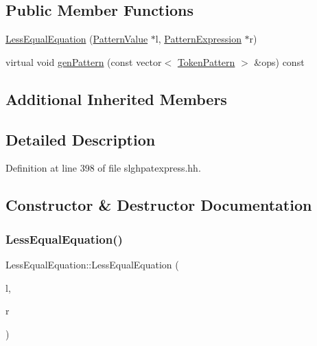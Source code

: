 \subsection*{Public Member Functions}
\begin{DoxyCompactItemize}
\item 
\mbox{\hyperlink{class_less_equal_equation_a382850b818427f262e9131aacb8fa949}{Less\+Equal\+Equation}} (\mbox{\hyperlink{class_pattern_value}{Pattern\+Value}} $\ast$l, \mbox{\hyperlink{class_pattern_expression}{Pattern\+Expression}} $\ast$r)
\item 
virtual void \mbox{\hyperlink{class_less_equal_equation_ace9862ee9b24e31d3e07b76556f3e220}{gen\+Pattern}} (const vector$<$ \mbox{\hyperlink{class_token_pattern}{Token\+Pattern}} $>$ \&ops) const
\end{DoxyCompactItemize}
\subsection*{Additional Inherited Members}


\subsection{Detailed Description}


Definition at line 398 of file slghpatexpress.\+hh.



\subsection{Constructor \& Destructor Documentation}
\mbox{\label{class_less_equal_equation_a382850b818427f262e9131aacb8fa949}} 
\subsubsection{\texorpdfstring{LessEqualEquation()}{LessEqualEquation()}}
{\footnotesize\ttfamily Less\+Equal\+Equation\+::\+Less\+Equal\+Equation (\begin{DoxyParamCaption}\item[{\mbox{\hyperlink{class_pattern_value}{Pattern\+Value}} $\ast$}]{l,  }\item[{\mbox{\hyperlink{class_pattern_expression}{Pattern\+Expression}} $\ast$}]{r }\end{DoxyParamCaption})\hspace{0.3cm}{\ttfamily [inline]}}



